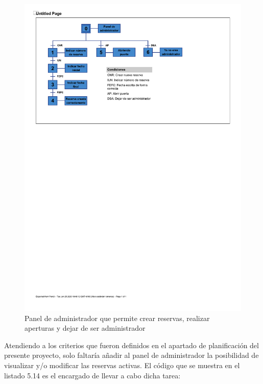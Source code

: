\begin{figure}[tbp]
\centering
\includegraphics[scale=1]{fig/Grafcet_reserva_apertura_y_dejar_administracion.pdf}
\caption{Panel de administrador que permite crear reservas, realizar aperturas y dejar de ser administrador}
\label{fig:reserva-apertura-y-dejar-administracion}
\end{figure}
Atendiendo a los criterios que fueron definidos en el apartado de planificación del presente proyecto, solo faltaría añadir al panel de administrador la posibilidad de visualizar y/o modificar las reservas activas. El código que se muestra en el listado 5.14 es el encargado de llevar a cabo dicha tarea:
